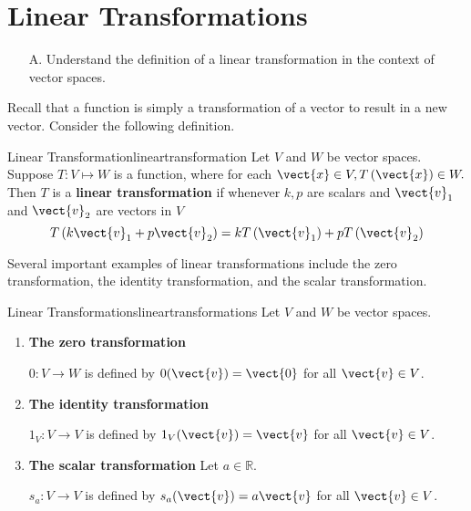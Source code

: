 \section{Linear Transformations}

\begin{outcome}
\begin{enumerate}
\item[A.] Understand the definition of a linear transformation in the context of vector spaces. 
\end{enumerate}
\end{outcome}

Recall that a function is simply a transformation of a vector to result in a new vector. Consider the following definition. 

\begin{definition}{Linear Transformation}{lineartransformation}
 Let $V$ and $W$ be vector spaces. Suppose $T: V \mapsto W$ is a function, where for each
$\vect{x} \in V ,T\left(\vect{x}\right)\in W.$ Then $T$ is a
\textbf{linear transformation} if whenever $k ,p $ are scalars and 
$\vect{v}_1$ and $\vect{v}_2$ are vectors in $V$
\begin{equation*}
T\left( k \vect{v}_1 + p \vect{v}_2 \right) = kT\left(\vect{v}_1\right)+ pT\left(\vect{v}_{2} \right)
\end{equation*}
\end{definition}

Several important examples of linear transformations include the zero transformation, the identity transformation, and the scalar transformation. 

\begin{example}{Linear Transformations}{lineartransformations}
Let $V$ and $W$ be vector spaces.

\begin{enumerate}
\item \textbf{The zero transformation}

$0:V\to W$ is defined by $0(\vect{v})=\vect{0}$ for all $\vect{v}\in V$.


\item \textbf{The identity transformation}

$1_V:V\to V$ is defined by $1_V(\vect{v})=\vect{v}$ for all $\vect{v}\in V$.

\item \textbf{The scalar transformation}
Let $a\in\mathbb{R}$.

$s_a:V\to V$ is defined by $s_a(\vect{v})=a\vect{v}$ for all $\vect{v}\in V$.
\end{enumerate}
\end{example}


